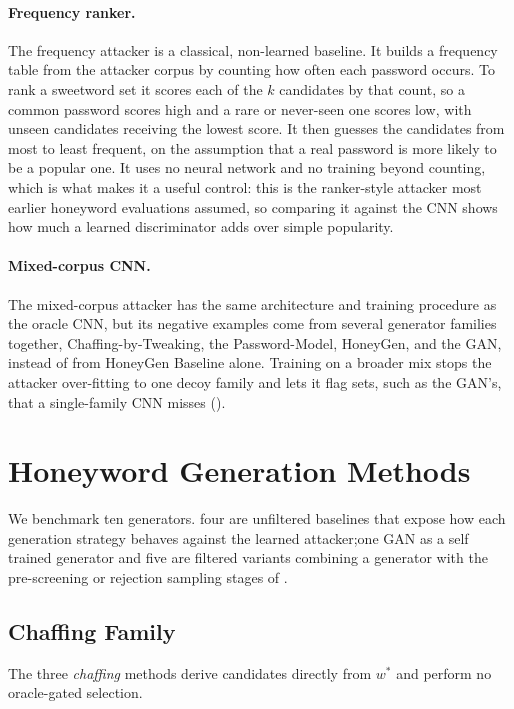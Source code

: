 \paragraph{Frequency ranker.}
The frequency attacker is a classical, non-learned baseline. It builds a
frequency table from the attacker corpus by counting how often each
password occurs. To rank a sweetword set it scores each of the $k$
candidates by that count, so a common password scores high and a rare or
never-seen one scores low, with unseen candidates receiving the lowest
score. It then guesses the candidates from most to least frequent, on
the assumption that a real password is more likely to be a popular one.
It uses no neural network and no training beyond counting, which is what
makes it a useful control: this is the ranker-style attacker most
earlier honeyword evaluations assumed, so comparing it against the CNN
shows how much a learned discriminator adds over simple popularity.

\paragraph{Mixed-corpus CNN.}
The mixed-corpus attacker has the same architecture and training
procedure as the oracle CNN, but its negative examples come from several
generator families together, Chaffing-by-Tweaking, the Password-Model,
HoneyGen, and the GAN, instead of from HoneyGen Baseline alone. Training
on a broader mix stops the attacker over-fitting to one decoy family and
lets it flag sets, such as the GAN's, that a single-family CNN misses
().

\section{Honeyword Generation Methods}
\label{sec:method-gens}

We benchmark ten generators. four are unfiltered baselines that expose
how each generation strategy behaves against the learned attacker;one GAN as a self trained generator 
 and five are filtered variants combining a generator with the pre-screening or
rejection sampling stages of .

\subsection{Chaffing Family}
\label{subsec:method-chaffing}

The three \emph{chaffing} methods derive candidates directly from
$w^{*}$ and perform no oracle-gated selection.

